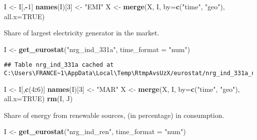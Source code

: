 \documentclass[
]{article}
\newenvironment{Shaded}{\begin{snugshade}}{\end{snugshade}}
\newcommand{\DataTypeTok}[1]{\textcolor[rgb]{0.13,0.29,0.53}{#1}}
\newcommand{\DecValTok}[1]{\textcolor[rgb]{0.00,0.00,0.81}{#1}}
\newcommand{\KeywordTok}[1]{\textcolor[rgb]{0.13,0.29,0.53}{\textbf{#1}}}
\newcommand{\NormalTok}[1]{#1}
\newcommand{\OperatorTok}[1]{\textcolor[rgb]{0.81,0.36,0.00}{\textbf{#1}}}
\newcommand{\OtherTok}[1]{\textcolor[rgb]{0.56,0.35,0.01}{#1}}
\newcommand{\StringTok}[1]{\textcolor[rgb]{0.31,0.60,0.02}{#1}}
\begin{document}
\begin{Shaded}
\begin{Highlighting}[]
\NormalTok{I \textless{}{-}}\StringTok{ }\NormalTok{I[,}\OperatorTok{{-}}\DecValTok{1}\NormalTok{]}
\KeywordTok{names}\NormalTok{(I)[}\DecValTok{3}\NormalTok{] \textless{}{-}}\StringTok{ "EMI"}
\NormalTok{X \textless{}{-}}\StringTok{ }\KeywordTok{merge}\NormalTok{(X, I, }\DataTypeTok{by=}\KeywordTok{c}\NormalTok{(}\StringTok{"time"}\NormalTok{, }\StringTok{"geo"}\NormalTok{), }\DataTypeTok{all.x=}\OtherTok{TRUE}\NormalTok{)}
\end{Highlighting}
\end{Shaded}

Share of largest electricity generator in the market.

\begin{Shaded}
\begin{Highlighting}[]
\NormalTok{I \textless{}{-}}\StringTok{ }\KeywordTok{get\_eurostat}\NormalTok{(}\StringTok{"nrg\_ind\_331a"}\NormalTok{, }\DataTypeTok{time\_format =} \StringTok{"num"}\NormalTok{)}
\end{Highlighting}
\end{Shaded}

\begin{verbatim}
## Table nrg_ind_331a cached at C:\Users\FRANCE~1\AppData\Local\Temp\RtmpAvsUzX/eurostat/nrg_ind_331a_num_code_FF.rds
\end{verbatim}

\begin{Shaded}
\begin{Highlighting}[]
\NormalTok{I \textless{}{-}}\StringTok{ }\NormalTok{I[,}\KeywordTok{c}\NormalTok{(}\DecValTok{4}\OperatorTok{:}\DecValTok{6}\NormalTok{)]}
\KeywordTok{names}\NormalTok{(I)[}\DecValTok{3}\NormalTok{] \textless{}{-}}\StringTok{ "MAR"}
\NormalTok{X \textless{}{-}}\StringTok{ }\KeywordTok{merge}\NormalTok{(X, I, }\DataTypeTok{by=}\KeywordTok{c}\NormalTok{(}\StringTok{"time"}\NormalTok{, }\StringTok{"geo"}\NormalTok{), }\DataTypeTok{all.x=}\OtherTok{TRUE}\NormalTok{)}
\KeywordTok{rm}\NormalTok{(I, J)}
\end{Highlighting}
\end{Shaded}

Share of energy from renewable sources, (in percentage) in consumption.

\begin{Shaded}
\begin{Highlighting}[]
\NormalTok{I \textless{}{-}}\StringTok{ }\KeywordTok{get\_eurostat}\NormalTok{(}\StringTok{"nrg\_ind\_ren"}\NormalTok{, }\DataTypeTok{time\_format =} \StringTok{"num"}\NormalTok{)}
\end{Highlighting}
\end{Shaded}
\end{document}

